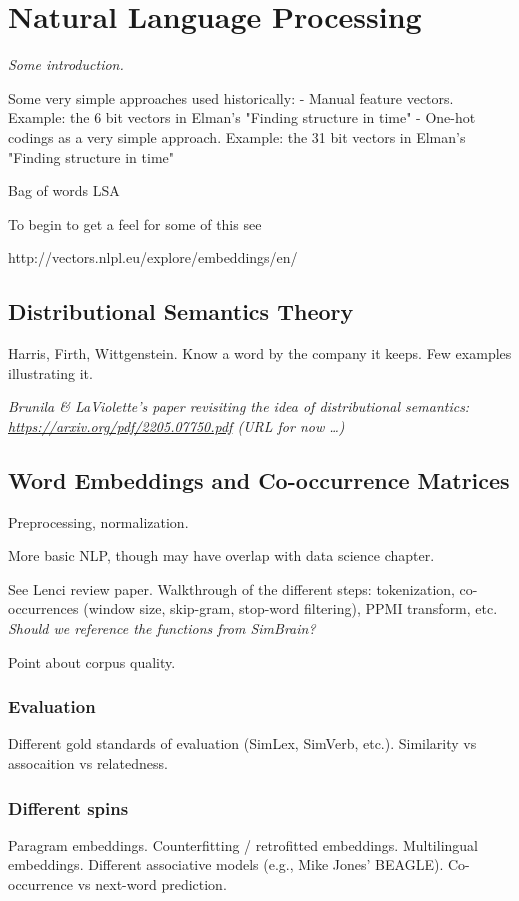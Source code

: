 \chapter{Natural Language Processing}\label{ch_nlp}

\textit{Some introduction.}

Some very simple approaches used historically:
- Manual feature vectors.  Example: the 6 bit vectors in Elman's "Finding structure in time"
- One-hot codings as a very simple approach. Example: the 31 bit vectors  in Elman's "Finding structure in time"

Bag of words
LSA

To begin to get a feel for some of this see

http://vectors.nlpl.eu/explore/embeddings/en/

\section{Distributional Semantics Theory}
Harris, Firth, Wittgenstein.
Know a word by the company it keeps.
Few examples illustrating it.

\textit{Brunila \& LaViolette's paper revisiting the idea of distributional semantics: \url{https://arxiv.org/pdf/2205.07750.pdf} (URL for now \dots)}

\section{Word Embeddings and Co-occurrence Matrices}

Preprocessing, normalization.

More basic NLP, though may have overlap with data science chapter. 

See Lenci review paper.
Walkthrough of the different steps: tokenization, co-occurrences (window size, skip-gram, stop-word filtering), PPMI transform, etc.
\textit{Should we reference the functions from SimBrain?}

Point about corpus quality.

\subsection{Evaluation}
Different gold standards of evaluation (SimLex, SimVerb, etc.).
Similarity vs assocaition vs relatedness.

\subsection{Different spins}
Paragram embeddings.
Counterfitting / retrofitted embeddings.
Multilingual embeddings.
Different associative models (e.g., Mike Jones' BEAGLE).
Co-occurrence vs next-word prediction.

